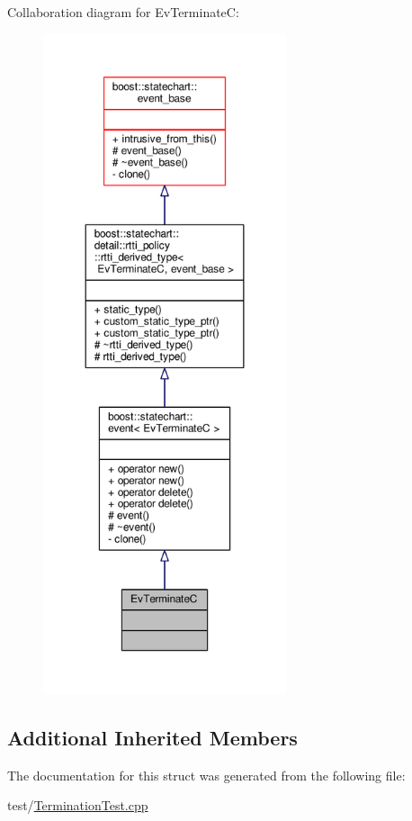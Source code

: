 Collaboration diagram for Ev\+TerminateC\+:
\nopagebreak
\begin{figure}[H]
\begin{center}
\leavevmode
\includegraphics[height=550pt]{struct_ev_terminate_c__coll__graph}
\end{center}
\end{figure}
\subsection*{Additional Inherited Members}


The documentation for this struct was generated from the following file\+:\begin{DoxyCompactItemize}
\item 
test/\mbox{\hyperlink{_termination_test_8cpp}{Termination\+Test.\+cpp}}\end{DoxyCompactItemize}
